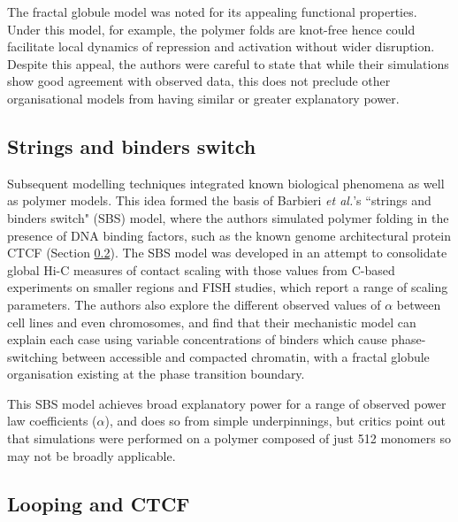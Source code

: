 \documentclass[a4paper,11pt,oneside]{book}
\begin{document}

The fractal globule model was noted for its appealing functional properties. Under this model, for example, the polymer folds are knot-free hence could facilitate local dynamics of repression and activation without wider disruption.\cite{Mirny2011} Despite this appeal, the authors were careful to state that while their simulations show good agreement with observed data, this does not preclude other organisational models from having similar or greater explanatory power.\cite{Lieberman2009}

\subsection{Strings and binders switch}\label{intro:sbs}

Subsequent modelling techniques integrated known biological phenomena as well as polymer models. This idea formed the basis of Barbieri \emph{et al.}'s\cite{Barbieri2012} ``strings and binders switch" (SBS) model, where the authors simulated polymer folding in the presence of DNA binding factors, such as the known genome architectural protein CTCF (Section \ref{intro:loops}). The SBS model was developed in an attempt to consolidate global Hi-C measures of contact scaling with those values from C-based experiments on smaller regions and FISH studies, which report a range of scaling parameters. The authors also explore the different observed values of $\alpha$ between cell lines and even chromosomes, and find that their mechanistic model can explain each case using variable concentrations of binders which cause phase-switching between accessible and compacted chromatin, with a fractal globule organisation existing at the phase transition boundary.\cite{Barbieri2012}

This SBS model achieves broad explanatory power for a range of observed power law coefficients ($\alpha$), and does so from simple underpinnings, but critics point out that simulations were performed on a polymer composed of just 512 monomers so may not be broadly applicable.\cite{Dekker2013}

\subsection{Looping and CTCF}\label{intro:loops}
\end{document}

